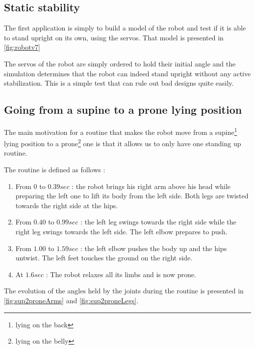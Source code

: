 \subsection{Static stability}
The first application is simply to build a model of the robot and test if it is able to stand upright on its own, using the servos. That model is presented in \cref{fig:robotv7}

The servos of the robot are simply ordered to hold their initial angle and the simulation determines that the robot can indeed stand upright without any active stabilization. This is a simple test that can rule out bad designs quite easily.

\subsection{Going from a supine to a prone lying position}
The main motivation for a routine that makes the robot move from a supine\footnote{lying on the back} lying position to a prone\footnote{lying on the belly} one is that it allows us to only have one standing up routine. 

The routine is defined as follows :\begin{enumerate}
\item From $0$ to $0.39sec$ : the robot brings his right arm above his head while preparing the left one to lift its body from the left side. Both legs are twisted towards the right side at the hips.

\item From $0.40$ to $0.99sec$ : the left leg swings towards the right side while the right leg swings towards the left side. The left elbow prepares to push.

\item From $1.00$ to $1.59sec$ : the left elbow pushes the body up and the hips untwist. The left feet touches the ground on the right side.

\item At $1.6sec$ : The robot relaxes all its limbs and is now prone.
\end{enumerate}

The evolution of the angles held by the joints during the routine is presented in \cref{fig:sup2proneArms} and \cref{fig:sup2proneLegs}. 

